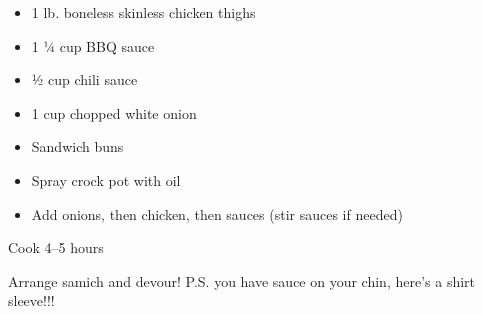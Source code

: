 \fromMom

\ingredients
\begin{itemize}
\item 1 lb. boneless skinless chicken thighs
\item 1 ¼ cup BBQ sauce
\item ½ cup chili sauce
\item 1 cup chopped white onion
\item Sandwich buns
\item Spray crock pot with oil
\item Add onions, then chicken, then sauces (stir sauces if needed)
\end{itemize}

\instructions

Cook 4--5 hours

Arrange samich and devour! P.S. you have sauce on your chin, here's a
shirt sleeve!!!
